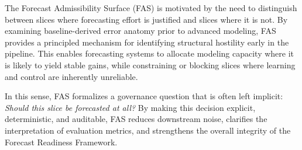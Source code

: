 The Forecast Admissibility Surface (FAS) is motivated by the need to distinguish
between slices where forecasting effort is justified and slices where it is not.
By examining baseline-derived error anatomy prior to advanced modeling, FAS
provides a principled mechanism for identifying structural hostility early in
the pipeline. This enables forecasting systems to allocate modeling capacity
where it is likely to yield stable gains, while constraining or blocking slices
where learning and control are inherently unreliable.

In this sense, FAS formalizes a governance question that is often left implicit:
\emph{Should this slice be forecasted at all?} By making this decision explicit,
deterministic, and auditable, FAS reduces downstream noise, clarifies the
interpretation of evaluation metrics, and strengthens the overall integrity of
the Forecast Readiness Framework.
